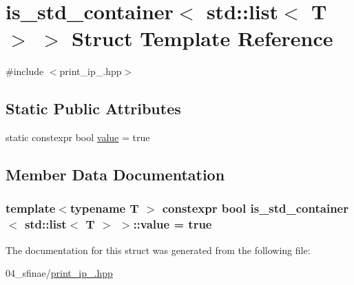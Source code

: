 \hypertarget{structis__std__container_3_01std_1_1list_3_01T_01_4_01_4}{}\section{is\+\_\+std\+\_\+container$<$ std\+:\+:list$<$ T $>$ $>$ Struct Template Reference}
\label{structis__std__container_3_01std_1_1list_3_01T_01_4_01_4}


{\ttfamily \#include $<$print\+\_\+ip\+\_.\+hpp$>$}

\subsection*{Static Public Attributes}
\begin{DoxyCompactItemize}
\item 
static constexpr bool \hyperlink{structis__std__container_3_01std_1_1list_3_01T_01_4_01_4_a48eb4438df57ff04cfe7417deeaf7062}{value} = true
\end{DoxyCompactItemize}


\subsection{Member Data Documentation}
\subsubsection[{\texorpdfstring{value}{value}}]{\setlength{\rightskip}{0pt plus 5cm}template$<$typename T $>$ constexpr bool {\bf is\+\_\+std\+\_\+container}$<$ std\+::list$<$ T $>$ $>$\+::value = true\hspace{0.3cm}{\ttfamily [static]}}\hypertarget{structis__std__container_3_01std_1_1list_3_01T_01_4_01_4_a48eb4438df57ff04cfe7417deeaf7062}{}\label{structis__std__container_3_01std_1_1list_3_01T_01_4_01_4_a48eb4438df57ff04cfe7417deeaf7062}


The documentation for this struct was generated from the following file\+:\begin{DoxyCompactItemize}
\item 
04\+\_\+sfinae/\hyperlink{print__ip__04_8hpp}{print\+\_\+ip\+\_.\+hpp}\end{DoxyCompactItemize}
